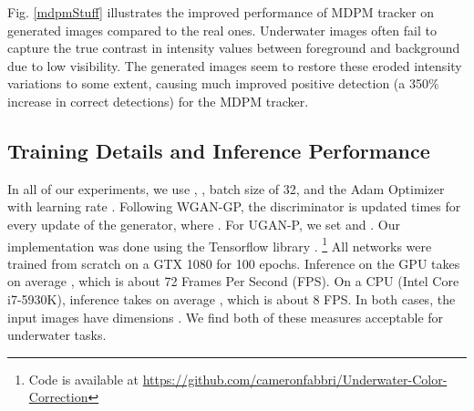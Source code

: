 Fig. \ref{mdpmStuff} illustrates the improved performance of MDPM tracker on generated images compared to the real ones. 
Underwater images often fail to capture the true contrast in intensity values between foreground and background due to low 
visibility. The generated images seem to restore these eroded intensity variations to some extent, causing much improved positive 
detection (a 350\% increase in correct detections) for the MDPM tracker.


\subsection{Training Details and Inference Performance}
In all of our experiments, we use , , batch size of 32, and the Adam Optimizer 
\cite{kingma2014adam} with learning rate . Following WGAN-GP, the discriminator is updated  times for every update of the 
generator, where . For UGAN-P, we set  and . Our implementation was done using the 
Tensorflow library \cite{abadi2016tensorflow}. \footnote{Code is available at 
\url{https://github.com/cameronfabbri/Underwater-Color-Correction}} All networks were trained from scratch on a GTX 1080 for 100 
epochs. Inference on the GPU takes on average , which is about 72 Frames Per Second (FPS). On a CPU (Intel Core 
i7-5930K), inference takes on average , which is about 8 FPS. In both cases, the input images have dimensions 
. We find both of these measures acceptable for underwater tasks.

